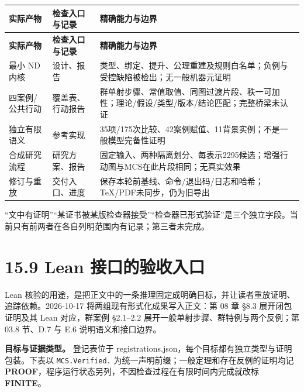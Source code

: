 \documentclass[UTF8,a4paper,zihao=-4,fontset=windows,openany]{ctexbook}
\newcommand{\mcsbrk}{\penalty 200\relax}
\begin{document}
\begingroup\small\setlength{\tabcolsep}{4pt}
\begin{longtable}{>{\raggedright\arraybackslash}p{}>{\raggedright\arraybackslash}p{}>{\raggedright\arraybackslash}p{}}
\toprule
\textbf{实际产物} & \textbf{检查入口与记录} & \textbf{精确能力与边界} \\
\midrule
\endfirsthead
\toprule
\textbf{实际产物} & \textbf{检查入口与记录} & \textbf{精确能力与边界} \\
\midrule
\endhead
\bottomrule
\endfoot
\bottomrule
\endlastfoot
最小 ND 内核 & 设计、报告 & 类型、绑定、提升、公理重建及规则白名单；负例与受控缺陷被检出；无一般机器元证明 \\
四案例/公共行动 & 覆盖表、行动报告 & 群单射步骤、常值取值、同图过渡片段、秩一可加性；理论/假设/类型/版本/结论匹配；完整桥梁未认证 \\
独立有限语义 & 参考实现 & 35项/175次比较、42案例赋值、11背景实例；不是一般模型完备性证明 \\
合成研究流程 & 研究方案、报告 & 固定输入、两种隔离划分、每表示2295候选；增强行动图与MCS在此片段相同；无真实效果 \\
修订与重放 & 交付入口、进度 & 保存本轮前基线、命令/退出码/日志和哈希；TeX/PDF未同步，仍为旧导出 \\
\end{longtable}
\endgroup

“文中有证明”“某证书被某版检查器接受”“检查器已形式验证”是三个独立字段。当前只有前两者在各自列明范围内有记录；第三者未完成。

\section{15.9 Lean 接口的验收入口}
Lean 核验的用途，是把正文中的一条推理固定成明确目标，并让读者重放证明、追踪依赖。2026-10-17 将两组现有形式化成果写入正文：第 08 章 §8.3 展开闭包证明及其 Lean 对应，群案例 §2.1–2.2 展开一般单射步骤、群特例与两个反例；第 03.8 节、D.7 与 E.6 说明语义和接口边界。

\textbf{目标与证据类型。} 登记表位于 registrations.json，每个目标都有独立类型与证明包装。下表以 \texttt{MCS.\mcsbrk{}Verified.\mcsbrk{}} 为统一声明前缀；一般定理和存在反例的证明均记 \textbf{PROOF}，程序运行状态另列，不因检查过程在有限时间内完成就改标 \textbf{FINITE}。
\end{document}
